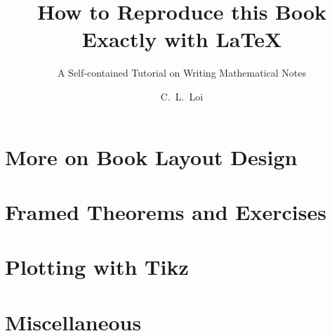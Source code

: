\documentclass{scrbook}
\title{How to Reproduce this Book Exactly with \LaTeX}
\subtitle{A Self-contained Tutorial on Writing Mathematical Notes}
\author{C.~L.~Loi}
\begin{document}
\frontmatter
\maketitle
\tableofcontents
\mainmatter






\chapter{More on Book Layout Design}
\chapter{Framed Theorems and Exercises}
\chapter{Plotting with Tikz}
\chapter{Miscellaneous}
\end{document}
